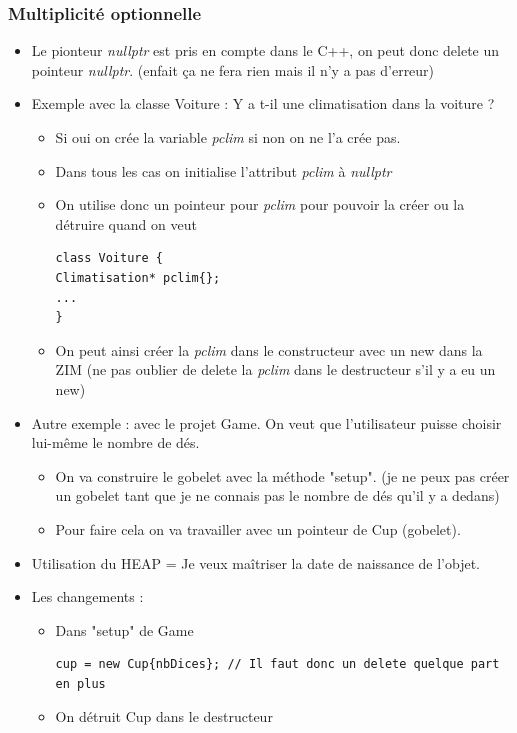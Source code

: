 \documentclass[12pt,a4paper]{article}
\begin{document}
\subsubsection{Multiplicité optionnelle}
\begin{itemize}
\item Le pionteur \textit{nullptr} est pris en compte dans le C++, on peut donc delete un pointeur \textit{nullptr}. (enfait ça ne fera rien mais il n'y a pas d'erreur)
\item Exemple avec la classe Voiture : Y a t-il une climatisation dans la voiture ?
\begin{itemize}
\item Si oui on crée la variable \textit{pclim} si non on ne l'a crée pas.
\item Dans tous les cas on initialise l'attribut \textit{pclim} à \textit{nullptr}
\item On utilise donc un pointeur pour \textit{pclim} pour pouvoir la créer ou la détruire quand on veut
\begin{lstlisting}
class Voiture {
Climatisation* pclim{};
...
}
\end{lstlisting}
\item On peut ainsi créer la \textit{pclim} dans le constructeur avec un new dans la ZIM (ne pas oublier de delete la \textit{pclim} dans le destructeur s'il y a eu un new)
\end{itemize}
\item Autre exemple : avec le projet Game. On veut que l'utilisateur puisse choisir lui-même le nombre de dés.
\begin{itemize}
\item On va construire le gobelet avec la méthode "setup". (je ne peux pas créer un gobelet tant que je ne connais pas le nombre de dés qu'il y a dedans)
\item Pour faire cela on va travailler avec un pointeur de Cup (gobelet).
\end{itemize}
\item Utilisation du HEAP = Je veux maîtriser la date de naissance de l'objet.
\item Les changements :
\begin{itemize}
\item Dans "setup" de Game
\begin{lstlisting}
cup = new Cup{nbDices}; // Il faut donc un delete quelque part en plus
\end{lstlisting}
\item On détruit Cup dans le destructeur

\end{itemize}
\end{itemize}
\end{document}
